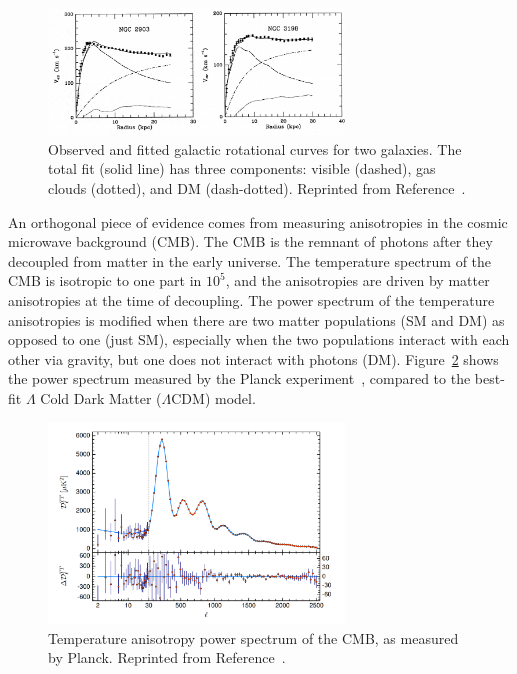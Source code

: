 \begin{figure}[]
\begin{center}
    \includegraphics[width=0.7\textwidth]{figures/theory/dm_rot.png}
    \caption{Observed and fitted galactic rotational curves for two galaxies.
             The total fit (solid line) has three components: visible (dashed), gas clouds (dotted), and DM (dash-dotted). 
             Reprinted from Reference~\cite{dmrot}.}
    \label{fig:theory:dm_rot}
\end{center}
\end{figure}

An orthogonal piece of evidence comes from measuring anisotropies in the cosmic microwave background (CMB).
The CMB is the remnant of photons after they decoupled from matter in the early universe.
The temperature spectrum of the CMB is isotropic to one part in ${10^5}$, and the anisotropies are driven by matter anisotropies at the time of decoupling.
The power spectrum of the temperature anisotropies is modified when there are two matter populations (SM and DM) as opposed to one (just SM), especially when the two populations interact with each other via gravity, but one does not interact with photons (DM).
Figure~\ref{fig:theory:planck} shows the power spectrum measured by the Planck experiment~\cite{planck}, compared to the best-fit ${\Lambda}$ Cold Dark Matter (${\Lambda}$CDM) model.

\begin{figure}[]
\begin{center}
    \includegraphics[width=0.7\textwidth]{figures/theory/planck.png}
    \caption{Temperature anisotropy power spectrum of the CMB, as measured by Planck.
             Reprinted from Reference~\cite{planck}.}
    \label{fig:theory:planck}
\end{center}
\end{figure}

